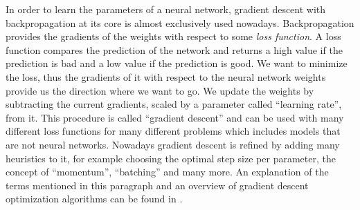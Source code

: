 In order to learn the parameters of a neural network, gradient descent with backpropagation \cite{bib:linnainmaa1976taylor} at its core is almost exclusively used nowadays. Backpropagation provides the gradients of the weights with respect to some \textit{loss function}. A loss function compares the prediction of the network and returns a high value if the prediction is bad and a low value if the prediction is good. We want to minimize the loss, thus the gradients of it with respect to the neural network weights provide us the direction where we want to go. We update the weights by subtracting the current gradients, scaled by a parameter called \enquote{learning rate}, from it. This procedure is called \enquote{gradient descent} and can be used with many different loss functions for many different problems which includes models that are not neural networks. Nowadays gradient descent is refined by adding many heuristics to it, for example choosing the optimal step size per parameter, the concept of \enquote{momentum}, \enquote{batching} and many more. An explanation of the terms mentioned in this paragraph and an overview of gradient descent optimization algorithms can be found in \cite{bib:ruder2016overview}.


